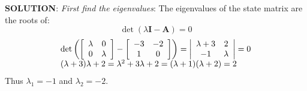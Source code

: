 \textbf{SOLUTION}: \emph{First find the eigenvalues}:
The eigenvalues of the state matrix are the roots of:
\[
\det(\lambda\mathbf{I}-\mathbf{A})=0
\]
\[
\begin{array}{l}
 \det \left( {\left[ {\begin{array}{*{20}c}
   \lambda  & 0  \\
   0 & \lambda   \\
\end{array}} \right] - \left[ {\begin{array}{*{20}c}
   { - 3} & { - 2}  \\
   1 & 0  \\
\end{array}} \right]} \right) = \left| {\begin{array}{*{20}c}
   {\lambda  + 3} & 2  \\
   { - 1} & \lambda   \\
\end{array}} \right| = 0 \\ 
 (\lambda  + 3)\lambda  + 2 = \lambda ^2  + 3\lambda  + 2 = (\lambda  + 1)(\lambda  + 2) = 2 \\ 
 \end{array}
\]
Thus $\lambda_1=-1$ and $\lambda_2=-2$.

